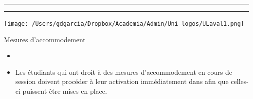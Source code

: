 \documentclass[xcolor=dvipsnames, onlymath, 10pt, aspectratio=169, handout]{beamer}
\title{\course}
\subtitle{\classtopic}
\author{Guilherme D.\ Garcia}
\institute[Université Laval] %
{
  \mylink{https://fr.gdgarcia.ca}{fr.gdgarcia.ca}\vspace{5ex}
}
\date{\classdate}
\begin{document}
\begin{frame}
	\vspace{2ex}
	\textcolor{lav1}{\noindent\rule{0.66\textwidth}{3pt}}
	\textcolor{lav2}{\noindent\rule{0.33\textwidth}{3pt}}

	\titlepage

	\vfill

	\begin{center}
		{\texttt{[image: /Users/gdgarcia/Dropbox/Academia/Admin/Uni-logos/ULaval1.png]}}
	\end{center}

\end{frame}





%  
%
% 
%    


\begin{frame}{Mesures d'accommodement}

	\begin{itemize}
		\item {}
		\item[] Les étudiants qui ont droit à des mesures d'accommodement en cours de session doivent procéder à leur activation immédiatement dans  afin que celles-ci puissent être mises en place.

	\end{itemize}

\end{frame}


%
\end{document}
